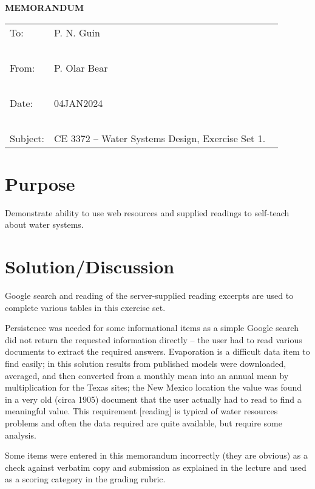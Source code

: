 \documentclass[12pt]{article}
\begin{document}
\begin{center}
\textbf{MEMORANDUM}
\end{center}
\begingroup
\begin{tabular}{p{1in} p{5in}}
\hline
\hline
To: & P. N. Guin \\ ~\\
From: & P. Olar Bear \\ ~\\
Date: & 04JAN2024 \\ ~\\
Subject: & CE 3372 -- Water Systems Design, Exercise Set 1. ~\\
\hline
\hline
\end{tabular}
\endgroup
\section*{{Purpose}} 
Demonstrate ability to use web resources and supplied readings to self-teach about water systems.
\section*{Solution/Discussion}
Google search and reading of the server-supplied reading excerpts are used to complete various tables in this exercise set.

Persistence was needed for some informational items as a simple Google search did not return the requested information directly -- the user had to read various documents to extract the required answers.
Evaporation is a difficult data item to find easily; in this solution results from published models were downloaded, averaged, and then converted from a monthly mean into an annual mean by multiplication for the Texas sites; the New Mexico location the value was found in a very old (circa 1905) document that the user actually had to read to find a meaningful value.  
This requirement [reading] is typical of water resources problems and often the data required are quite available, but require some analysis.

Some items were entered in this memorandum incorrectly (they are obvious) as a check against verbatim copy and submission as explained in the lecture and used as a scoring category in the grading rubric.
\end{document}

